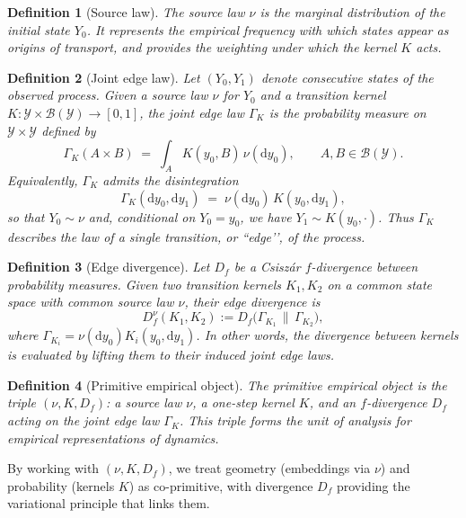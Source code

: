 \documentclass[11pt]{article}
\newtheorem{definition}{Definition}
\newcommand{\1}{\mathbf{1}}
\begin{document}
\begin{definition}[Source law]
The \emph{source law} $\nu$ is the marginal distribution of the initial
state $Y_0$. It represents the empirical frequency with which states
appear as origins of transport, and provides the weighting under which
the kernel $K$ acts.
\end{definition}

\begin{definition}[Joint edge law]
Let $(Y_0,Y_1)$ denote consecutive states of the observed process. 
Given a source law $\nu$ for $Y_0$ and a transition kernel 
$K : \mathcal{Y} \times \mathcal{B}(\mathcal{Y}) \to [0,1]$, the 
\emph{joint edge law} $\Gamma_K$ is the probability measure on 
$\mathcal{Y} \times \mathcal{Y}$ defined by
\[
  \Gamma_K(A \times B) \;=\; \int_A K(y_0,B)\,\nu(\mathrm dy_0),
  \qquad A,B \in \mathcal{B}(\mathcal{Y}).
\]
Equivalently, $\Gamma_K$ admits the disintegration
\[
  \Gamma_K(\mathrm dy_0,\mathrm dy_1) \;=\; 
    \nu(\mathrm dy_0)\,K(y_0,\mathrm dy_1),
\]
so that $Y_0 \sim \nu$ and, conditional on $Y_0=y_0$, we have 
$Y_1 \sim K(y_0,\cdot)$. Thus $\Gamma_K$ describes the law of a 
single transition, or ``edge’’, of the process.
\end{definition}

\begin{definition}[Edge divergence]
Let $D_f$ be a Csiszár $f$-divergence between probability measures.
Given two transition kernels $K_1,K_2$ on a common state space with
common source law $\nu$, their \emph{edge divergence} is
\[
  D_f^{\nu}(K_1,K_2)
  := D_f\!\big(\Gamma_{K_1}\,\big\|\,\Gamma_{K_2}\big),
\]
where $\Gamma_{K_i} = \nu(\mathrm dy_0)K_i(y_0,\mathrm dy_1)$. In other
words, the divergence between kernels is evaluated by lifting them to
their induced joint edge laws.
\end{definition}

\begin{definition}[Primitive empirical object]
The \emph{primitive empirical object} is the triple
\((\nu,K,D_f)\): a source law $\nu$, a one-step kernel $K$, and an
$f$-divergence $D_f$ acting on the joint edge law $\Gamma_K$. This
triple forms the unit of analysis for empirical representations of
dynamics.
\end{definition}

\noindent
By working with $(\nu,K,D_f)$, we treat geometry (embeddings via $\nu$) 
and probability (kernels $K$) as co-primitive, with divergence $D_f$ 
providing the variational principle that links them.
\end{document}
